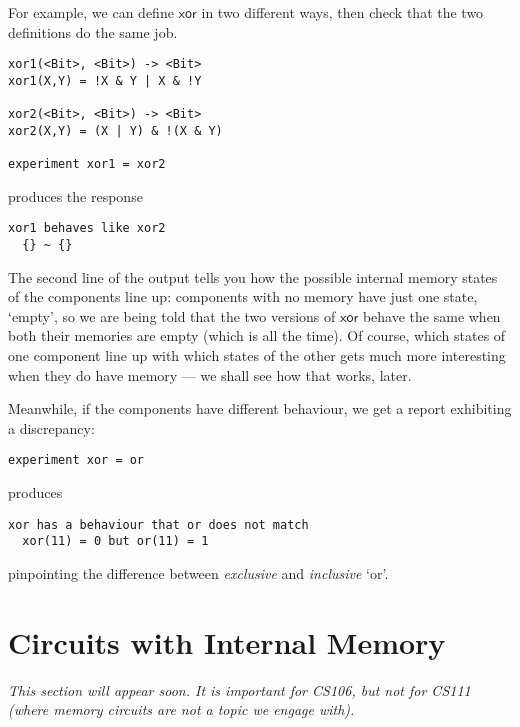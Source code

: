 \documentclass{article}
\newcommand{\C}{\mathsf}
\begin{document}
For example, we can define $\C{xor}$ in two different ways,
then check that the two definitions do the same job.
\begin{verbatim}
xor1(<Bit>, <Bit>) -> <Bit>
xor1(X,Y) = !X & Y | X & !Y

xor2(<Bit>, <Bit>) -> <Bit>
xor2(X,Y) = (X | Y) & !(X & Y)

experiment xor1 = xor2
\end{verbatim}
produces the response
\begin{verbatim}
xor1 behaves like xor2
  {} ~ {}
\end{verbatim}
The second line of the output tells you how the possible
internal memory states of the components line up: components with
no memory have just one state, `empty', so we are being told
that the two versions of $\C{xor}$ behave the same when both
their memories are empty (which is all the time). Of course,
which states of one component line up with which states of the
other gets much more interesting when they do have memory ---
we shall see how that works, later.

Meanwhile, if the components have different behaviour, we
get a report exhibiting a discrepancy:
\begin{verbatim}
experiment xor = or
\end{verbatim}
produces
\begin{verbatim}
xor has a behaviour that or does not match
  xor(11) = 0 but or(11) = 1
\end{verbatim}
pinpointing the difference between \emph{exclusive} and
\emph{inclusive} `or'.


\section{Circuits with Internal Memory}

\emph{This section will appear soon. It is important for CS106, but
  not for CS111 (where memory circuits are not a topic we engage with).}
\end{document}
